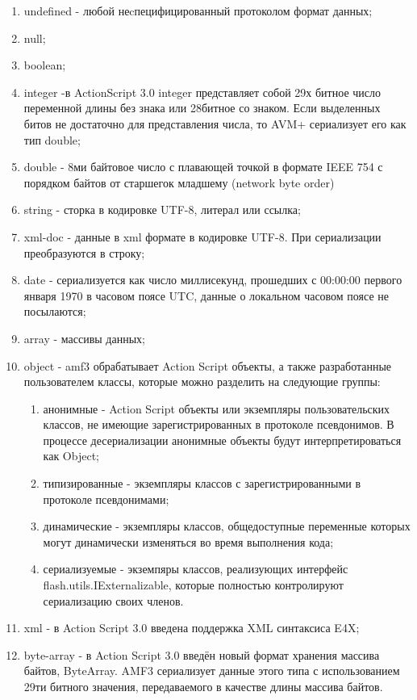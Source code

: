 \begin{enumerate}
\item undefined - любой неcпецифицированный протоколом формат данных;
\item null;
\item boolean;
\item integer -в ActionScript 3.0 integer представляет собой 29х битное число переменной длины без знака или 28битное 
со знаком. Если выделенных битов не достаточно для представления числа, то AVM+ сериализует его как тип double;
\item double - 8ми байтовое число с плавающей точкой в формате IEEE 754 с порядком байтов от старшегок младшему 
(network byte order)
\item string - сторка в кодировке UTF-8, литерал или ссылка;
\item xml-doc - данные в xml формате в кодировке UTF-8. При сериализации преобразуются в строку;
\item date - сериализуется как число миллисекунд, прошедших с 00:00:00 первого января 1970 в часовом поясе UTC, 
данные о локальном часовом поясе не посылаются;
\item array - массивы данных;
\item object - amf3 обрабатывает Action Script объекты, а также разработанные пользователем классы, которые можно 
разделить на следующие группы:
\begin{enumerate}
\item анонимные - Action Script объекты или экземпляры пользовательских классов, не имеющие зарегистрированных в 
протоколе псевдонимов. В процессе десериализации анонимные объекты будут интерпретироваться как Object;
\item типизированные - экземпляры классов с зарегистрированными в протоколе псевдонимами;
\item динамические - экземпляры классов, общедоступные переменные которых могут динамически изменяться во время 
выполнения кода;
\item сериализуемые - экземпяры классов, реализующих интерфейс flash.utils.IExternalizable, которые полностью 
контролируют сериализацию своих членов.
\end{enumerate}
\item xml - в Action Script 3.0 введена поддержка XML синтаксиса E4X;
\item byte-array - в Action Script 3.0 введён новый формат хранения массива байтов, ByteArray. AMF3 сериализует 
данные этого типа с использованием 29ти битного значения, передаваемого в качестве длины массива байтов.
\end{enumerate}

